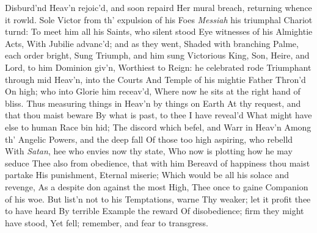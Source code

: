 \documentclass[11pt]{book}
\begin{document}
Disburd'nd Heav'n rejoic'd, and soon repaird 
Her mural breach, returning whence it rowld. 
Sole Victor from th' expulsion of his Foes 
\textit{Messiah} his triumphal Chariot turnd: 
To meet him all his Saints, who silent stood 
Eye witnesses of his Almightie Acts, 
With Jubilie advanc'd; and as they went, 
Shaded with branching Palme, each order bright, 
Sung Triumph, and him sung Victorious King, 
Son, Heire, and Lord, to him Dominion giv'n, 
Worthiest to Reign: he celebrated rode 
Triumphant through mid Heav'n, into the Courts 
And Temple of his mightie Father Thron'd 
On high; who into Glorie him receav'd, 
Where now he sits at the right hand of bliss. 
\quad Thus measuring things in Heav'n by things on Earth 
At thy request, and that thou maist beware 
By what is past, to thee I have reveal'd 
What might have else to human Race bin hid; 
The discord which befel, and Warr in Heav'n 
Among th' Angelic Powers, and the deep fall 
Of those too high aspiring, who rebelld 
With \textit{Satan}, hee who envies now thy state, 
Who now is plotting how he may seduce 
Thee also from obedience, that with him 
Bereavd of happiness thou maist partake 
His punishment, Eternal miserie; 
Which would be all his solace and revenge, 
As a despite don against the most High, 
Thee once to gaine Companion of his woe. 
But list'n not to his Temptations, warne 
Thy weaker; let it profit thee to have heard 
By terrible Example the reward 
Of disobedience; firm they might have stood, 
Yet fell; remember, and fear to transgress. 


\Book
 
\end{document}
